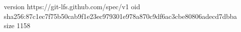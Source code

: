 version https://git-lfs.github.com/spec/v1
oid sha256:87c1ec7f75b50cab9f1e23ec979301e978a870c9df6ac3cbe80806adecd7dbba
size 1158
